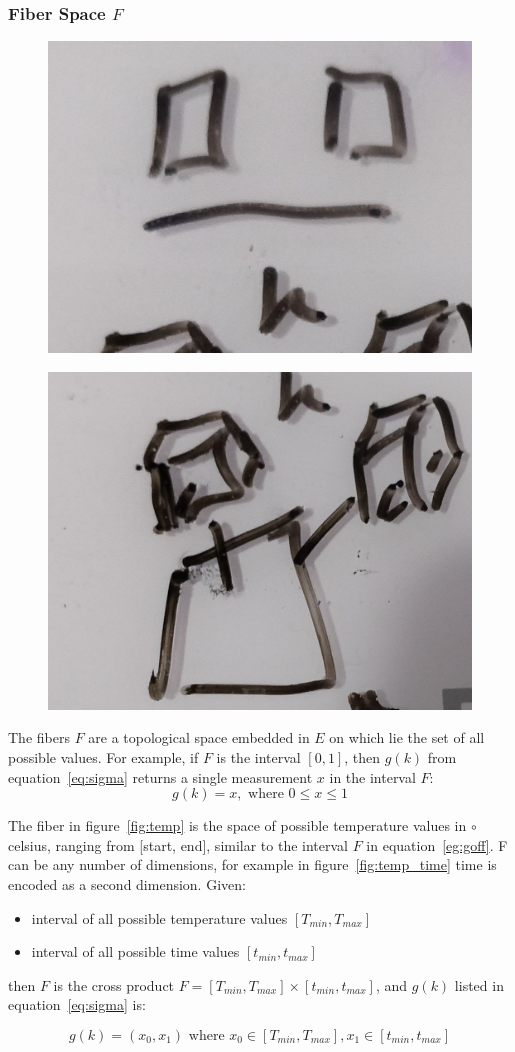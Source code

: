 \documentclass[../main.tex]{subfiles}
\begin{document}
\subsubsection{Fiber Space $F$}
\begin{figure}[ht]
    \includegraphics[width=0.2\linewidth]{figures/sections/math/temp_2f.png}
    \label{fig:}
\end{figure}
\begin{figure}[ht]
    \includegraphics[width=0.2\linewidth]{figures/sections/math/temp_3f.png}
\end{figure}
The fibers $F$ are a topological space embedded in $E$ on which lie the set of all possible values. For example, if $F$ is the interval $[0, 1]$, then $g(k)$ from equation~\ref{eq:sigma} returns a single measurement $x$ in the interval $F$:
\begin{equation}
    \label{eg:goff}
    g(k) = x, \text{ where } 0\leq x \leq 1
\end{equation}

The fiber in figure~\ref{fig:temp} is the space of possible temperature values in $\circ$ celsius, ranging from [start, end], similar to the interval $F$ in equation~\ref{eg:goff}. F can be any number of dimensions, for example in figure~\ref{fig:temp_time} time is encoded as a second dimension. Given:
\begin{itemize}
\item interval of all possible temperature values $[T_{min}, T_{max}]$ 
\item interval of all possible  time values $[t_{min}, t_{max}]$
\end{itemize}

then $F$ is the cross product $F= [T_{min}, T_{max}] \times [t_{min}, t_{max}]$, and $g(k)$ listed in equation~\ref{eq:sigma} is:

\begin{equation}
g(k) = (x_0, x_1) \text{ where } x_0 \in [T_{min}, T_{max}], x_1 \in [t_{min}, t_{max}]
\end{equation}
\end{document}
